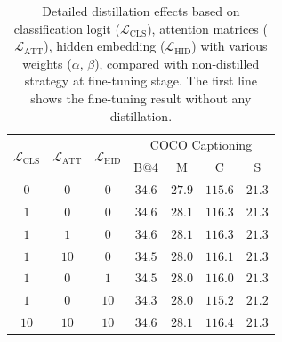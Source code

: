 \begin{table}[t!]
    \centering
    \setlength{\tabcolsep}{3.8pt} %
    \renewcommand{\arraystretch}{1.2} %
    \caption[Detailed distillation effects based on classification logit ($\mathcal{L}_\text{CLS}$), attention matrices ($\mathcal{L}_\text{ATT}$), hidden embedding ($\mathcal{L}_\text{HID}$).]{
    Detailed distillation effects based on classification logit ($\mathcal{L}_\text{CLS}$), attention matrices ($\mathcal{L}_\text{ATT}$), hidden embedding ($\mathcal{L}_\text{HID}$) with various weights ($\alpha$, $\beta$), compared with non-distilled strategy at fine-tuning stage. The first line shows the fine-tuning result without any distillation.
    }    
    { \small
    \begin{tabular}{ccc|cccc}
    \toprule
    \multirow{2}{*}{\textbf{$\mathcal{L}_\text{CLS}$}} & \multirow{2}{*}{\textbf{$\mathcal{L}_\text{ATT}$}} &  \multirow{2}{*}{\textbf{$\mathcal{L}_\text{HID}$}} & \multicolumn{4}{c}{{ COCO Captioning}}   \\ 
    & & & {B@4} & {M} & {C} & {S} \\
    \hline 
    $0$ & $0$ & $0$ & $34.6$ & $27.9$ & $115.6$ & $21.3$ \\
    $1$ & $0$ & $0$ & $34.6$ & $28.1$ & $116.3$ & $21.3$\\
    $1$ & $1$ & $0$ & $34.6$ & $28.1$ & $116.3$ & $21.3$ \\
    $1$ & $10$ & $0$ & $34.5$ & $28.0$ & $116.1$ & $21.3$ \\
    $1$ & $0$ & $1$ & $34.5$ & $28.0$ & $116.0$ & $21.3$ \\
    $1$ & $0$ & $10$ & $34.3$ & $28.0$ & $115.2$ & $21.2$ \\
    $10$ & $10$ & $10$ &  $34.6$ & $28.1$ & $116.4$ & $21.3$\\
    \bottomrule
    \end{tabular}
    }
    \label{tab:downablation}
\end{table}



